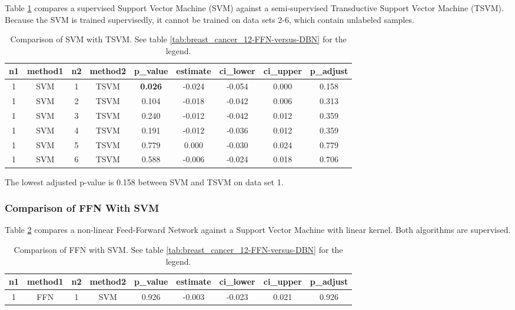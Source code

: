 Table \ref{tab:breast_cancer_12-SVM-versus-TSVM} compares a supervised
Support Vector Machine (SVM) against a semi-supervised Transductive
Support Vector Machine (TSVM). Because the SVM is trained supervisedly,
it cannot be trained on data sets 2-6, which contain unlabeled samples.

\begin{table}[p]
\begin{centering}
\begin{tabular}{|c|c|c|c|c|c|c|c|c|}
\hline 
n1 & method1 & n2 & method2 & p\_value & estimate & ci\_lower & ci\_upper & p\_adjust\tabularnewline
\hline 
\hline 
1 & SVM & 1 & TSVM & \textbf{0.026} & -0.024 & -0.054 & 0.000 & 0.158\tabularnewline
\hline 
1 & SVM & 2 & TSVM & 0.104 & -0.018 & -0.042 & 0.006 & 0.313\tabularnewline
\hline 
1 & SVM & 3 & TSVM & 0.240 & -0.012 & -0.042 & 0.012 & 0.359\tabularnewline
\hline 
1 & SVM & 4 & TSVM & 0.191 & -0.012 & -0.036 & 0.012 & 0.359\tabularnewline
\hline 
1 & SVM & 5 & TSVM & 0.779 & 0.000 & -0.030 & 0.024 & 0.779\tabularnewline
\hline 
1 & SVM & 6 & TSVM & 0.588 & -0.006 & -0.024 & 0.018 & 0.706\tabularnewline
\hline 
\end{tabular}
\par\end{centering}
\caption[Comparison of SVM with TSVM.]{\label{tab:breast_cancer_12-SVM-versus-TSVM}Comparison of SVM with
TSVM. See table \ref{tab:breast_cancer_12-FFN-versus-DBN} for the
legend.}
\end{table}

The lowest adjusted p-value is 0.158 between SVM and TSVM on data
set 1.

\subsubsection{Comparison of FFN With SVM}

Table \ref{fig:breast_cancer_12-FFN-versus-SVM} compares a non-linear
Feed-Forward Network against a Support Vector Machine with linear
kernel. Both algorithms are supervised.

\begin{table}[p]
\begin{centering}
\begin{tabular}{|c|c|c|c|c|c|c|c|c|}
\hline 
n1 & method1 & n2 & method2 & p\_value & estimate & ci\_lower & ci\_upper & p\_adjust\tabularnewline
\hline 
\hline 
1 & FFN & 1 & SVM & 0.926 & -0.003 & -0.023 & 0.021 & 0.926\tabularnewline
\hline 
\end{tabular}
\par\end{centering}
\caption[Comparison of FFN with SVM.]{\label{fig:breast_cancer_12-FFN-versus-SVM}Comparison of FFN with
SVM. See table \ref{tab:breast_cancer_12-FFN-versus-DBN} for the
legend.}
\end{table}

